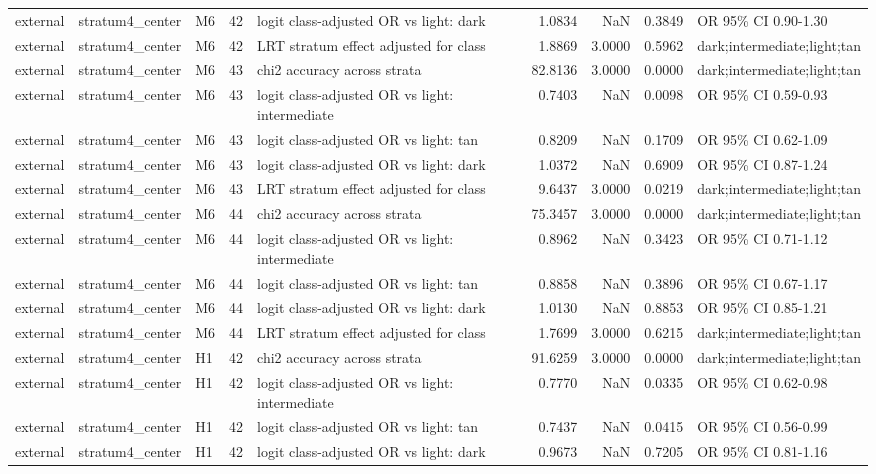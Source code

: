 \begin{tabular}{lllrlrrrl}
external & stratum4\_center & M6 & 42 & logit class-adjusted OR vs light: dark & 1.0834 & NaN & 0.3849 & OR 95\% CI 0.90-1.30 \\
external & stratum4\_center & M6 & 42 & LRT stratum effect adjusted for class & 1.8869 & 3.0000 & 0.5962 & dark;intermediate;light;tan \\
external & stratum4\_center & M6 & 43 & chi2 accuracy across strata & 82.8136 & 3.0000 & 0.0000 & dark;intermediate;light;tan \\
external & stratum4\_center & M6 & 43 & logit class-adjusted OR vs light: intermediate & 0.7403 & NaN & 0.0098 & OR 95\% CI 0.59-0.93 \\
external & stratum4\_center & M6 & 43 & logit class-adjusted OR vs light: tan & 0.8209 & NaN & 0.1709 & OR 95\% CI 0.62-1.09 \\
external & stratum4\_center & M6 & 43 & logit class-adjusted OR vs light: dark & 1.0372 & NaN & 0.6909 & OR 95\% CI 0.87-1.24 \\
external & stratum4\_center & M6 & 43 & LRT stratum effect adjusted for class & 9.6437 & 3.0000 & 0.0219 & dark;intermediate;light;tan \\
external & stratum4\_center & M6 & 44 & chi2 accuracy across strata & 75.3457 & 3.0000 & 0.0000 & dark;intermediate;light;tan \\
external & stratum4\_center & M6 & 44 & logit class-adjusted OR vs light: intermediate & 0.8962 & NaN & 0.3423 & OR 95\% CI 0.71-1.12 \\
external & stratum4\_center & M6 & 44 & logit class-adjusted OR vs light: tan & 0.8858 & NaN & 0.3896 & OR 95\% CI 0.67-1.17 \\
external & stratum4\_center & M6 & 44 & logit class-adjusted OR vs light: dark & 1.0130 & NaN & 0.8853 & OR 95\% CI 0.85-1.21 \\
external & stratum4\_center & M6 & 44 & LRT stratum effect adjusted for class & 1.7699 & 3.0000 & 0.6215 & dark;intermediate;light;tan \\
external & stratum4\_center & H1 & 42 & chi2 accuracy across strata & 91.6259 & 3.0000 & 0.0000 & dark;intermediate;light;tan \\
external & stratum4\_center & H1 & 42 & logit class-adjusted OR vs light: intermediate & 0.7770 & NaN & 0.0335 & OR 95\% CI 0.62-0.98 \\
external & stratum4\_center & H1 & 42 & logit class-adjusted OR vs light: tan & 0.7437 & NaN & 0.0415 & OR 95\% CI 0.56-0.99 \\
external & stratum4\_center & H1 & 42 & logit class-adjusted OR vs light: dark & 0.9673 & NaN & 0.7205 & OR 95\% CI 0.81-1.16 \\

\end{tabular}
